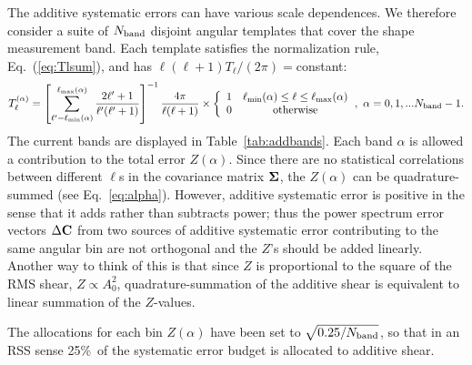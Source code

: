 \documentclass[aps,prd, amsmath,amssymb,superscriptaddress,showkeys,nofootinbib,reprint,preprintnumbers]{revtex4-1}
\begin{document}
\begin{widetext}
The additive systematic errors can have various scale dependences. We
therefore consider a suite of $N_{\rm band}$ disjoint angular
templates that cover the shape measurement band. Each template
satisfies the normalization rule, Eq.~(\ref{eq:Tlsum}), and has
$\ell(\ell+1)T_\ell/(2\pi)=$constant:
\begin{equation}
T_\ell^{(\alpha)} = \left[ \sum_{\ell'=\ell_{\rm min}(\alpha)}^{\ell_{\rm max}(\alpha)} \frac{2\ell'+1}{\ell'(\ell'+1)} \right]^{-1} \frac{4\pi}{\ell(\ell+1)}
\times\left\{ \begin{array}{cc} 1 & \ell_{\rm min}(\alpha)\le\ell\le\ell_{\rm max}(\alpha) \\ 0 & {\rm otherwise} \end{array} \right.\!,~\alpha=0,1,...N_{\rm band}-1.
\end{equation}
The current bands are displayed in Table~\ref{tab:addbands}. Each band
$\alpha$ is allowed a contribution to the total error
$Z(\alpha)$. Since there are no statistical correlations between
different $\ell$s in the covariance matrix ${\bf\Sigma}$, the
$Z(\alpha)$ can be quadrature-summed (see
Eq.~\ref{eq:alpha}). However, additive systematic error is positive in
the sense that it adds rather than subtracts power; thus the power
spectrum error vectors $\Delta{\bf C}$ from two sources of additive
systematic error contributing to the same angular bin are not
orthogonal and the $Z$'s should be added linearly. Another way to
think of this is that since $Z$ is proportional to the square of the
RMS shear, $Z\propto A_0^2$, quadrature-summation of the additive
shear is equivalent to linear summation of the $Z$-values.

The allocations for each bin $Z(\alpha)$ have been set to
$\sqrt{0.25/N_{\rm band}}$, so that in an RSS sense 25\%\ of the
systematic error budget is allocated to additive shear.


\end{widetext}
\end{document}
